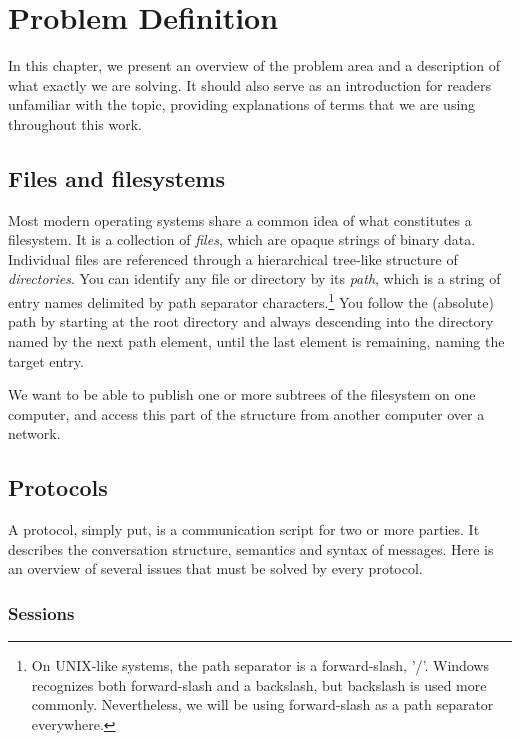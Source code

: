 
\chapter{Problem Definition}

In this chapter, we present an overview of the problem area and a description of what exactly we are solving.
It should also serve as an introduction for readers unfamiliar with the topic, providing explanations of terms
that we are using throughout this work.


\section{Files and filesystems}

Most modern operating systems share a common idea of what constitutes a filesystem. It is a collection of {\it
files}, which are opaque strings of binary data. Individual files are referenced through a hierarchical
tree-like structure of {\it directories}.  You can identify any file or directory by its {\it path}, which is
a string of entry names delimited by path separator characters.\footnote{On UNIX-like systems, the path
separator is a forward-slash, '/'. Windows recognizes both forward-slash and a backslash, but backslash is
used more commonly. Nevertheless, we will be using forward-slash as a path separator everywhere.} You follow
the (absolute) path by starting at the root directory and always descending into the directory named by the
next path element, until the last element is remaining, naming the target entry.

We want to be able to publish one or more subtrees of the filesystem on one computer, and access this part of
the structure from another computer over a network.


\section{Protocols}

A protocol, simply put, is a communication script for two or more parties. It describes the conversation
structure, semantics and syntax of messages. Here is an overview of several issues that must be solved by
every protocol.


\subsection{Sessions}

